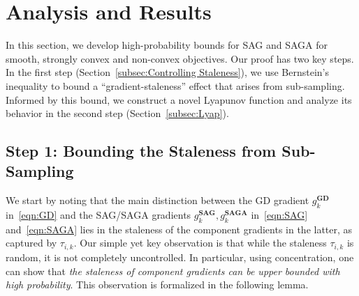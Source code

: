 \documentclass{article}
\theoremstyle{plain}
\theoremstyle{definition}
\begin{document}
\section{Analysis and Results}\label{sec:analysis}
In this section, we develop high-probability bounds for SAG and SAGA for smooth, strongly convex and non-convex objectives. Our proof has two key steps. In the first step (Section~\ref{subsec:Controlling Staleness}), we use Bernstein's inequality to bound a ``gradient-staleness'' effect that arises from sub-sampling. Informed by this bound, we construct a novel Lyapunov function and analyze its behavior in the second step (Section~\ref{subsec:Lyap}). 

\vspace{-2mm}
\subsection{Step 1: Bounding the Staleness from Sub-Sampling}
\vspace{-1mm}
\label{subsec:Controlling Staleness}
We start by noting that the main distinction between the GD gradient $g_k^\textbf{GD}$ in~\eqref{eqn:GD} and the SAG/SAGA gradients $g_k^\textbf{SAG}, g_k^\textbf{SAGA}$ in~\eqref{eqn:SAG} and~\eqref{eqn:SAGA} lies in the staleness of the component gradients in the latter, as captured by $\tau_{i,k}$. Our simple yet key observation is that while the staleness $\tau_{i,k}$ is random, it is not completely uncontrolled. In particular, using concentration, one can show that \textit{the staleness of component gradients can be upper bounded with high probability}. This observation is formalized in the following lemma.
\end{document}
